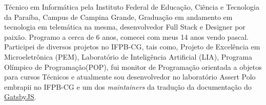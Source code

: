 \begin{cvletter}
  Técnico em Informática pela Instituto Federal de Educação, Ciência e Tecnologia da Paraíba, Campus de Campina Grande, Graduação em andamento em tecnologia em telemática na mesma, desenvolvedor Full Stack e Designer por paixão. Programo a cerca de 6 anos, comecei com meus 14 anos vendo pascal. Participei de diversos projetos no IFPB-CG, tais como, Projeto de Excelência em Microeletrônica (PEM), Laboratório de Inteligência Artificial (LIA), Programa Olímpico de Programação(POP), fui monitor de Programação orientada a objetos para cursos Técnicos e atualmente sou desenvolvedor no laboratório Assert Polo embrapii no IFPB-CG e um dos \textit{maintainers} da tradução da documentação do \href{https://www.gatsbyjs.org/}{GatsbyJS}.
  
\end{cvletter}